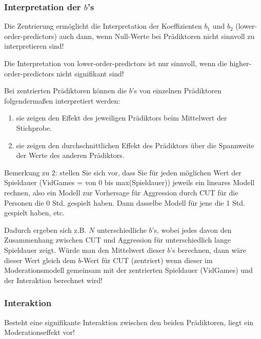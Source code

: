 \documentclass[]{article}
\providecommand{\tightlist}{%
  \setlength{\itemsep}{0pt}\setlength{\parskip}{0pt}}
\begin{document}
\hypertarget{interpretation-der-bs}{%
\subsubsection*{\texorpdfstring{Interpretation der \(b\)'s}{Interpretation der b's}}\label{interpretation-der-bs}}

Die Zentrierung ermöglicht die Interpretation der Koeffizienten \(b_1\) und \(b_2\) (lower-order-predictors) auch dann, wenn Null-Werte bei Prädiktoren nicht sinnvoll zu interpretieren sind!

Die Interpretation von lower-order-predictors ist nur sinnvoll, wenn die higher-order-predictors nicht signifikant sind!

Bei zentrierten Prädiktoren können die \(b\)'s von einzelnen Prädiktoren folgendermaßen interpretiert werden:

\begin{enumerate}
\def\labelenumi{\arabic{enumi}.}
\tightlist
\item
  sie zeigen den Effekt des jeweiligen Prädiktors beim Mittelwert der Stichprobe.
\item
  sie zeigen den durchschnittlichen Effekt des Prädiktors über die Spannweite der Werte des anderen Prädiktors.
\end{enumerate}

Bemerkung zu 2: stellen Sie sich vor, dass Sie für jeden möglichen Wert der Spieldauer (VidGames = von 0 bis max(Spieldauer)) jeweils ein lineares Modell rechnen, also ein Modell zur Vorhersage für Aggression durch CUT für die Personen die 0 Std. gespielt haben. Dann dasselbe Modell für jene die 1 Std. gespielt haben, etc.

Dadurch ergeben sich z.B. \(N\) unterschiedliche \(b\)'s, wobei jedes davon den Zusammenhang zwischen CUT und Aggression für unterschiedlich lange Spieldauer zeigt. Würde man den Mittelwert dieser \(b\)'s berechnen, dann wäre dieser Wert gleich dem \(b\)-Wert für CUT (zentriert) wenn dieser im Moderationsmodell gemeinsam mit der zentrierten Spieldauer (VidGames) und der Interaktion berechnet wird!

\hypertarget{interaktion}{%
\subsubsection*{Interaktion}\label{interaktion}}

Besteht eine signifikante Interaktion zwischen den beiden Prädiktoren, liegt ein Moderationseffekt vor!
\end{document}
